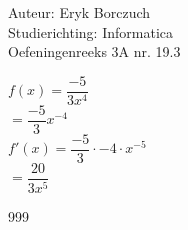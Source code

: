 \documentclass[a4paper]{article}
\begin{document}
  
\noindent \large Auteur: Eryk Borczuch \\
\noindent \large Studierichting: Informatica\\
\noindent \large Oefeningenreeks 3A nr. 19.3\\

\medskip

\normalsize

$f(x) = \dfrac{-5}{3x^4}$\\

$= \dfrac{-5}{3}x^{-4}$\\

$f'(x) = \dfrac{-5}{3}\cdot -4 \cdot x^{-5}$\\

$= \dfrac{20}{3x^5}$\\

\begin{thebibliography}{999}
\end{thebibliography}
\end{document}
